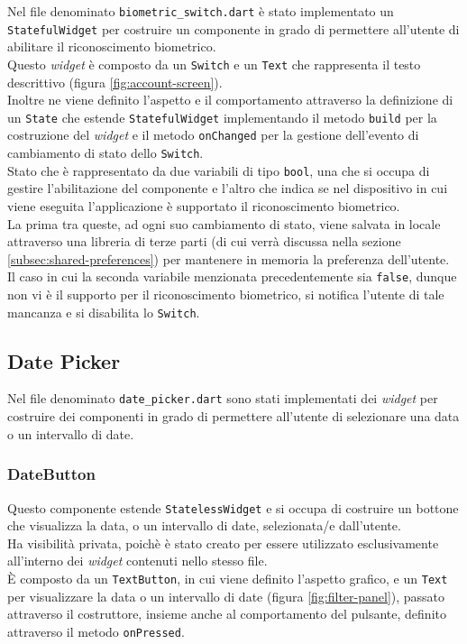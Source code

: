 Nel file denominato \lstinline{biometric_switch.dart} è stato implementato un \lstinline{StatefulWidget} per costruire un componente in grado di permettere all'utente di abilitare il riconoscimento biometrico. \\
Questo \emph{widget} è composto da un \lstinline{Switch}\cite{site:switch} e un \lstinline{Text}\cite{site:text} che rappresenta il testo descrittivo (figura \ref{fig:account-screen}).\\
Inoltre ne viene definito l'aspetto e il comportamento attraverso la definizione di un \lstinline{State} che estende \lstinline{StatefulWidget} implementando il metodo \lstinline{build} per la costruzione del \emph{widget} e il metodo \lstinline{onChanged} per la gestione dell'evento di cambiamento di stato dello \lstinline{Switch}.\\
Stato che è rappresentato da due variabili di tipo \lstinline{bool}, una che si occupa di gestire l'abilitazione del componente e l'altro che indica se nel dispositivo in cui viene eseguita l'applicazione è supportato il riconoscimento biometrico.\\
La prima tra queste, ad ogni suo cambiamento di stato, viene salvata in locale attraverso una libreria di terze parti (di cui verrà discussa nella sezione \ref{subsec:shared-preferences}) per mantenere in memoria la preferenza dell'utente. \\
Il caso in cui la seconda variabile menzionata precedentemente sia \lstinline{false}, dunque non vi è il supporto per il riconoscimento biometrico, si notifica l'utente di tale mancanza e si disabilita lo \lstinline{Switch}.

\subsection{Date Picker}
\label{subsec:date-picker}

Nel file denominato \lstinline{date_picker.dart} sono stati implementati dei \emph{widget} per costruire dei componenti in grado di permettere all'utente di selezionare una data o un intervallo di date.

\subsubsection*{DateButton}
\label{subsubsec:date-button}

Questo componente estende \lstinline{StatelessWidget} e si occupa di costruire un bottone che visualizza la data, o un intervallo di date, selezionata/e dall'utente.\\
Ha visibilità privata, poichè è stato creato per essere utilizzato esclusivamente all'interno dei \emph{widget} contenuti nello stesso file.\\
È composto da un \lstinline{TextButton}\cite{site:text-button}, in cui viene definito l'aspetto grafico, e un \lstinline{Text} per visualizzare la data o un intervallo di date (figura \ref{fig:filter-panel}), passato attraverso il costruttore, insieme anche al comportamento del pulsante, definito attraverso il metodo \lstinline{onPressed}\cite{site:on-pressed}.

